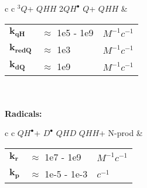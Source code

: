 \documentclass{article}
\def\QH{$QH^{\bullet }$}
\def\D{$D^{\bullet }$}
\def\Q{$Q$}
\def\Qt{$^{3}Q$}
\def\QHH{$QHH$}
\def\QHD{$QHD$}
\begin{document}
\begin{tabular}{ c c }
    \schemestart
    \Qt + \QHH
    \arrow{->[$k_{qH}$]}
    2\QH
    \arrow{<=>[$k_{dQ}$][$k_{redQ}$]}
    \Q + \QHH
    \schemestop
     & \begin{tabular}{ l l l }
           $\mathbf{k_{qH}}$   & $\approx$ 1e5 - 1e9 & $M^{-1}c^{-1}$ \\
           $\mathbf{k_{redQ}}$ & $\approx$ 1e3       & $M^{-1}c^{-1}$ \\
           $\mathbf{k_{dQ}}$   & $\approx$ 1e9       & $M^{-1}c^{-1}$ \\\hline
       \end{tabular}
    \vspace{1.5mm}
\end{tabular}
\vspace{1.5mm}
\\
\\
\textbf{Radicals:}

\begin{tabular}{ c c }
    \schemestart
    \QH + \D
    \arrow{->[$k_{r}$]}
    \QHD
    \arrow{->[$k_{p}$]}
    \QHH + N-prod
    \schemestop
     & \begin{tabular}{ l l l }
           $\mathbf{k_{r}}$ & $\approx$ 1e7 - 1e9   & $M^{-1}c^{-1}$ \\
           $\mathbf{k_{p}}$ & $\approx$ 1e-5 - 1e-3 & $c^{-1}$       \\\hline
       \end{tabular}
    \vspace{1.5mm}
\end{tabular}
\vspace{1.5mm}
\end{document}
